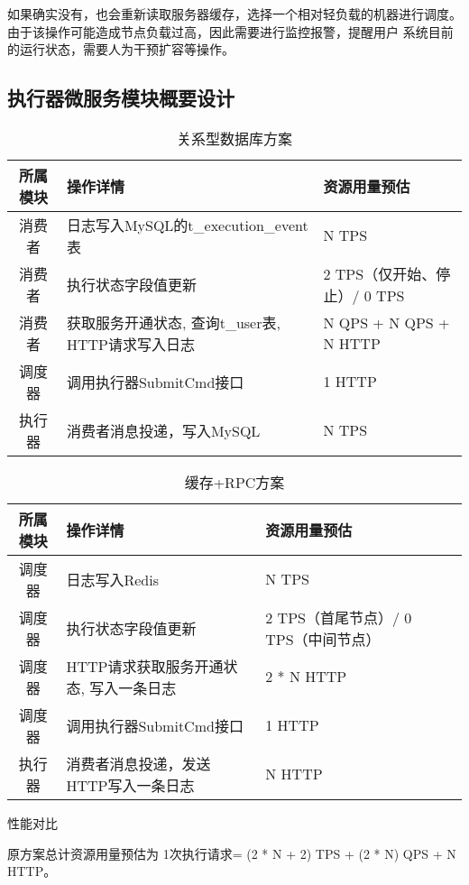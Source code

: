 如果确实没有，也会重新读取服务器缓存，选择一个相对轻负载的机器进行调度。由于该操作可能造成节点负载过高，因此需要进行监控报警，提醒用户
系统目前的运行状态，需要人为干预扩容等操作。


\subsection{执行器微服务模块概要设计}

\begin{table}[H]
    \centering
    \caption{关系型数据库方案}
    \label{tab:old_design}
    \begin{tabular}{cll}
        \toprule
        所属模块    &操作详情   &资源用量预估 \\
        \midrule
        消费者 & 日志写入MySQL的t\_execution\_event表 & N TPS \\
        消费者 & 执行状态字段值更新 & 2 TPS（仅开始、停止）/ 0 TPS \\
        消费者 & 获取服务开通状态, 查询t\_user表, HTTP请求写入日志 & N QPS + N QPS + N HTTP \\
        调度器 & 调用执行器SubmitCmd接口 & 1 HTTP \\
        执行器 & 消费者消息投递，写入MySQL & N TPS \\
        \bottomrule
    \end{tabular}
\end{table}



\begin{table}[H]
    \centering
    \caption{缓存+RPC方案}
    \label{tab:new_design}
    \begin{tabular}{cllll}
        \toprule
        所属模块	&操作详情	&资源用量预估 \\
        \midrule
        调度器 & 日志写入Redis & N TPS \\
        调度器 & 执行状态字段值更新 & 2 TPS（首尾节点）/ 0 TPS（中间节点） \\
        调度器 & HTTP请求获取服务开通状态, 写入一条日志 & 2 * N HTTP \\
        调度器 & 调用执行器SubmitCmd接口 & 1 HTTP \\
        执行器 & 消费者消息投递，发送HTTP写入一条日志 & N HTTP \\
        \bottomrule
    \end{tabular}
\end{table}

性能对比

原方案总计资源用量预估为 1次执行请求= (2 * N + 2) TPS + (2 * N) QPS + N HTTP。\cite{bansbach2021deep}

